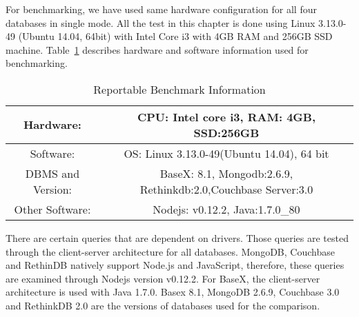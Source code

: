 For benchmarking, we have used same hardware configuration for all four databases in single mode. All the test in this chapter is done using  Linux 3.13.0-49 (Ubuntu 14.04, 64bit) with Intel Core i3 with 4GB RAM and 256GB SSD machine.
Table~\ref{benchmark-configuration-table} describes hardware and software information used for benchmarking. 
\begin{table}[h]	
	\centering
	\caption{Reportable Benchmark Information}
	\begin{tabular}{|c|c|c|c} 
		\hline
		Hardware: & \multicolumn{3}{|c|}{CPU: Intel core i3, RAM: 4GB, SSD:256GB  } \\
		\hline
		Software: & \multicolumn{3}{|c|}{OS: Linux 3.13.0-49(Ubuntu 14.04), 64 bit} \\
		\hline
		DBMS and Version: & \multicolumn{3}{|c|}{ BaseX: 8.1, Mongodb:2.6.9, Rethinkdb:2.0,Couchbase Server:3.0 } \\
		\hline
		Other Software: & \multicolumn{3}{|c|}{Nodejs: v0.12.2, Java:1.7.0\_80 } \\
		\hline
	\end{tabular}	
	\label{benchmark-configuration-table}
\end{table}
There are certain queries that are dependent on drivers. Those queries are tested through the client-server architecture for all databases. MongoDB, Couchbase and RethinDB natively support Node.js and JavaScript, therefore, these queries are examined through Nodejs version  v0.12.2. For BaseX, the client-server architecture is used with Java 1.7.0. Basex 8.1, MongoDB 2.6.9, Couchbase 3.0 and RethinkDB 2.0 are the versions of databases used for the comparison. 